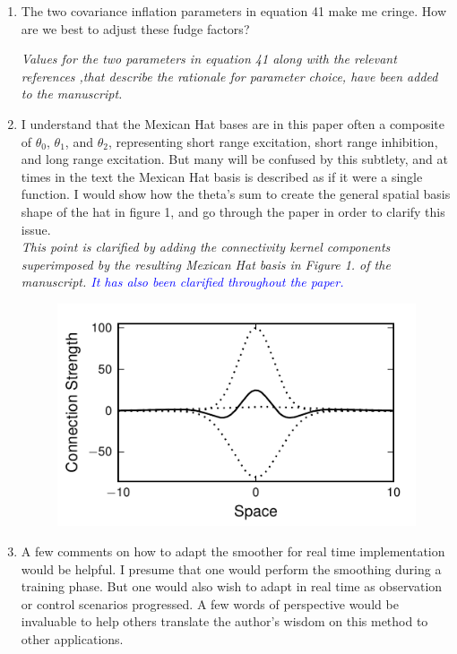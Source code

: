 \documentclass{article}
\newcommand{\parham}[1]{\textcolor{blue}{#1}}
\begin{document}
\begin{enumerate}
\item The two covariance inflation parameters in equation 41 make me cringe. How are we best to adjust these fudge factors?

\emph{Values for the two parameters in equation 41 along with the relevant references ,that describe the rationale for parameter choice, have been added to the manuscript.}

\item I understand that the Mexican Hat bases are in this paper often a composite of $\theta_0$, $\theta_1$, and $\theta_2$, representing short range excitation, short range inhibition, and long range excitation. But many will be confused by this subtlety, and at times in the text the Mexican Hat basis is described as if it were a single function. I would show how the theta's sum to create the general spatial basis shape of the hat in figure 1, and go through the paper in order to clarify this issue.\\

\emph{This point is clarified by adding the connectivity kernel components superimposed by the resulting Mexican Hat basis in Figure 1. of the manuscript. \parham{It has also been clarified throughout the paper.}}

 \begin{figure}[!ht]
 \begin{center}
 \includegraphics{./Graph/pdf/fig1.pdf} 
 \end{center}
 \caption{}
 \label{fig:Figure1}
 \end{figure}

\item A few comments on how to adapt the smoother for real time implementation would be helpful. I presume that one would perform the smoothing during a training phase. But one would also wish to adapt in real time as observation or control scenarios progressed. A few words of perspective would be invaluable to help others translate the author's wisdom on this method to other applications.


\end{enumerate}
\end{document}
